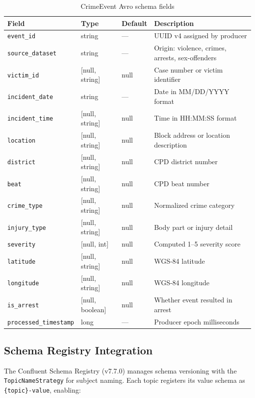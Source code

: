 \documentclass[12pt,a4paper]{article}
\begin{document}
\begin{table}[H]
\centering
\caption{CrimeEvent Avro schema fields}
\label{tab:avro}
\begin{tabularx}{\textwidth}{l l l X}
\toprule
\textbf{Field} & \textbf{Type} & \textbf{Default} & \textbf{Description} \\
\midrule
\texttt{event\_id} & string & --- & UUID v4 assigned by producer \\
\texttt{source\_dataset} & string & --- & Origin: violence, crimes, arrests, sex-offenders \\
\texttt{victim\_id} & [null, string] & null & Case number or victim identifier \\
\texttt{incident\_date} & string & --- & Date in MM/DD/YYYY format \\
\texttt{incident\_time} & [null, string] & null & Time in HH:MM:SS format \\
\texttt{location} & [null, string] & null & Block address or location description \\
\texttt{district} & [null, string] & null & CPD district number \\
\texttt{beat} & [null, string] & null & CPD beat number \\
\texttt{crime\_type} & [null, string] & null & Normalized crime category \\
\texttt{injury\_type} & [null, string] & null & Body part or injury detail \\
\texttt{severity} & [null, int] & null & Computed 1--5 severity score \\
\texttt{latitude} & [null, string] & null & WGS-84 latitude \\
\texttt{longitude} & [null, string] & null & WGS-84 longitude \\
\texttt{is\_arrest} & [null, boolean] & null & Whether event resulted in arrest \\
\texttt{processed\_timestamp} & long & --- & Producer epoch milliseconds \\
\bottomrule
\end{tabularx}
\end{table}

\subsection{Schema Registry Integration}

The Confluent Schema Registry (v7.7.0) manages schema versioning with the \texttt{TopicNameStrategy} for subject naming. Each topic registers its value schema as \texttt{\{topic\}-value}, enabling:
\end{document}
